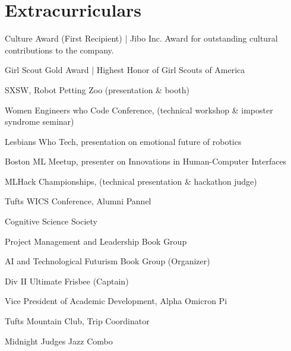 \documentclass[]{csaund_resume-openfont}
\begin{document}

\section{Extracurriculars}
\descript{ }
\begin{tightemize}
\item Culture Award (First Recipient) | Jibo Inc. Award for outstanding cultural contributions to the company.
\item Girl Scout Gold Award | Highest Honor of Girl Scouts of America
\end{tightemize}
\sectionsep

\descript {}
\begin{tightemize}
\item SXSW, Robot Petting Zoo (presentation \& booth)
\item Women Engineers who Code Conference, (technical workshop \& imposter syndrome seminar)
\item Lesbians Who Tech, presentation on emotional future of robotics 
\item Boston ML Meetup, presenter on Innovations in Human-Computer Interfaces
\item MLHack Championships, (technical presentation \& hackathon judge)
\item Tufts WICS Conference, Alumni Pannel 
\end{tightemize}
\sectionsep

\descript{ }
\begin{tightemize}
\item Cognitive Science Society
\item Project Management and Leadership Book Group 
\item AI and Technological Futurism Book Group (Organizer)
\item Div II Ultimate Frisbee (Captain)
\end{tightemize}
\begin{tightemize}
\item Vice President of Academic Development, Alpha Omicron Pi
\item Tufts Mountain Club, Trip Coordinator
\item Midnight Judges Jazz Combo
\end{tightemize}
\sectionsep
\end{document}

